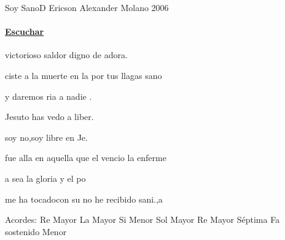 \documentclass[12pt, spanish]{book}
\begin{document}
    \begin{song}{Soy Sano}{D}
        {} %
        {Ericson Alexander Molano}
        {} %
        {2006}
        \ifChordBk

        \paragraph{\mbox{}\hfill\protect\href{https://open.spotify.com/intl-es/track/7w9SzawctdzdcmABWs2716}{Escuchar}\mbox{}\hfill}
        \fi

        \begin{SBOpGroup}
             victorioso saldor digno de adora.

            ciste a la muerte en la  por tus llagas sano 

            y  daremos ria a nadie .

            Jesuto has vedo a liber.
        \end{SBOpGroup}

        \begin{SBChorus}
            soy no,soy libre en Je.

            fue alla en aquella  que el vencio la enferme

            a  sea la gloria y el po

            me ha tocadocon su no he recibido sani.,a
        \end{SBChorus}


        \ifChordBk
        \begin{SBOpGroup}
            Acordes:
            \upchord{\D}\qquad Re Mayor \hfill
            \upchord{\A}\qquad La Mayor \hfill\null\break
            \upchord{\Bm}\qquad Si Menor \hfill
            \upchord{\G}\qquad Sol Mayor \hfill\null\break
            \upchord{\Dseven}\qquad Re Mayor S\'eptima \hfill
            \upchord{\Fsm}\qquad Fa sostenido Menor \hfill\null\break
        \end{SBOpGroup}
        \fi
    \end{song}
\end{document}
